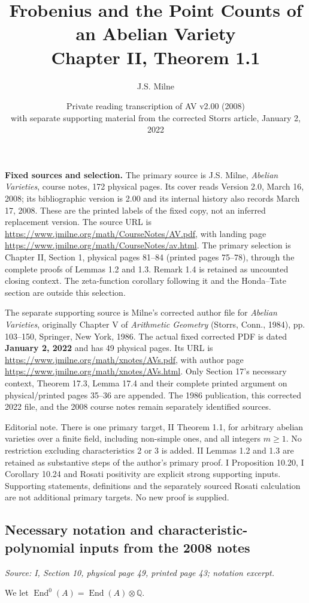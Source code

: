 \documentclass[11pt]{article}
\title{Frobenius and the Point Counts of an Abelian Variety\\Chapter II, Theorem 1.1}
\author{J.S. Milne}
\date{Private reading transcription of AV v2.00 (2008)\\with separate supporting material from the corrected Storrs article, January 2, 2022}
\DeclareMathOperator{\AVEnd}{End}
\newcommand{\AVQ}{\mathbb{Q}}
\newcommand{\AVsrc}[1]{\par\smallskip\noindent\textit{Source: #1.}\par\smallskip}
\newcommand{\AVeditorial}[1]{\par\smallskip\noindent\textsf{Editorial note.} #1\par\smallskip}
\begin{document}
\maketitle

\noindent\textbf{Fixed sources and selection.}
The primary source is J.S. Milne, \emph{Abelian Varieties}, course notes,
172 physical pages. Its cover reads Version 2.0, March 16, 2008;
its bibliographic version is 2.00 and its internal history also records
March 17, 2008. These are the printed labels of the fixed copy, not an
inferred replacement version. The source URL is
\url{https://www.jmilne.org/math/CourseNotes/AV.pdf}, with landing page
\url{https://www.jmilne.org/math/CourseNotes/av.html}.
The primary selection is Chapter II, Section 1, physical pages 81--84
(printed pages 75--78), through the complete proofs of Lemmas 1.2 and 1.3.
Remark 1.4 is retained as uncounted closing context. The zeta-function
corollary following it and the Honda--Tate section are outside this selection.

The separate supporting source is Milne's corrected author file for
\emph{Abelian Varieties}, originally Chapter V of \emph{Arithmetic Geometry}
(Storrs, Conn., 1984), pp. 103--150, Springer, New York, 1986.
The actual fixed corrected PDF is dated \textbf{January 2, 2022} and has
49 physical pages. Its URL is
\url{https://www.jmilne.org/math/xnotes/AVs.pdf}, with author page
\url{https://www.jmilne.org/math/xnotes/AVs.html}.
Only Section 17's necessary context, Theorem 17.3, Lemma 17.4 and their
complete printed argument on physical/printed pages 35--36 are appended.
The 1986 publication, this corrected 2022 file, and the 2008 course notes
remain separately identified sources.

\AVeditorial{There is one primary target, II Theorem 1.1, for arbitrary
abelian varieties over a finite field, including non-simple ones, and all
integers $m\geq1$. No restriction excluding characteristics 2 or 3 is added.
II Lemmas 1.2 and 1.3 are retained as substantive steps of the author's
primary proof. I Proposition 10.20, I Corollary 10.24 and Rosati positivity
are explicit strong supporting inputs. Supporting statements, definitions
and the separately sourced Rosati calculation are not additional primary
targets. No new proof is supplied.}

\subsection*{Necessary notation and characteristic-polynomial inputs from the 2008 notes}
\AVsrc{I, Section 10, physical page 49, printed page 43; notation excerpt}
We let $\AVEnd^0(A)=\AVEnd(A)\otimes\AVQ$.
\end{document}
